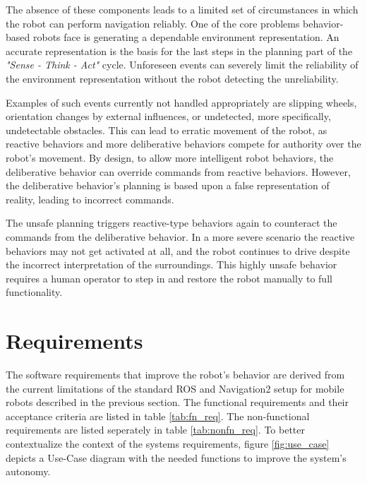 The absence of these components leads to a limited set of circumstances in which the robot can perform navigation reliably. One of the core problems behavior-based robots face is generating a dependable environment representation. An accurate representation is the basis for the last steps in the planning part of the \textit{"Sense - Think - Act"} cycle. Unforeseen events can severely limit the reliability of the environment representation without the robot detecting the unreliability. 

Examples of such events currently not handled appropriately are slipping wheels, orientation changes by external influences, or undetected, more specifically, undetectable obstacles. This can lead to erratic movement of the robot, as reactive behaviors and more deliberative behaviors compete for authority over the robot's movement. By design, to allow more intelligent robot behaviors, the deliberative behavior can override commands from reactive behaviors. However, the deliberative behavior's planning is based upon a false representation of reality, leading to incorrect commands. 

The unsafe planning triggers reactive-type behaviors again to counteract the commands from the deliberative behavior. In a more severe scenario the reactive behaviors may not get activated at all, and the robot continues to drive despite the incorrect interpretation of the surroundings. This highly unsafe behavior requires a human operator to step in and restore the robot manually to full functionality. 

\section{Requirements}
\label{sec:Requirements}

The software requirements that improve the robot's behavior are derived from the current limitations of the standard ROS and Navigation2 setup for mobile robots described in the previous section. The functional requirements and their acceptance criteria are listed in table \ref{tab:fn_req}. The non-functional requirements are listed seperately in table \ref{tab:nonfn_req}. To better contextualize the context of the systems requirements, figure \ref{fig:use_case} depicts a Use-Case diagram with the needed functions to improve the system's autonomy.

